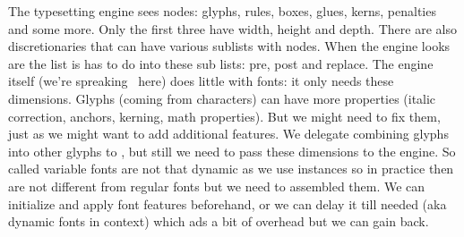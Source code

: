 








\startdocument
  [title={Fonts},
   banner={another year of playing},
   location={bachotex\enspace {\bf 2024}\enspace meeting}]

\starttitle[title=How does \TEX\ see them]

\startitemize
\startitem
    The typesetting engine sees nodes: glyphs, rules, boxes, glues, kerns,
    penalties and some more. Only the first three have width, height and depth.
\stopitem
\startitem
    There are also discretionaries that can have various sublists with nodes.
    When the engine looks are the list is has to do into these sub lists: pre,
    post and replace.
\stopitem
\startitem
    The engine itself (we're spreaking \LUAMETATEX\ here) does little with fonts:
    it only needs these dimensions.
\stopitem
\startitem
    Glyphs (coming from characters) can have more properties (italic correction,
    anchors, kerning, math properties). But we might need to fix them, just as
    we might want to add additional features.
\stopitem
\startitem
    We delegate combining glyphs into other glyphs to \LUA, but still we need to
    pass these dimensions to the engine.
\stopitem
\startitem
    So called variable fonts are not that dynamic as we use instances so in
    practice then are not different from regular fonts but we need to assembled
    them.
\stopitem
\startitem
    We can initialize and apply font features beforehand, or we can delay it till
    needed (aka dynamic fonts in context) which ads a bit of overhead but we can
    gain back.
\stopitem
\stopitemize

